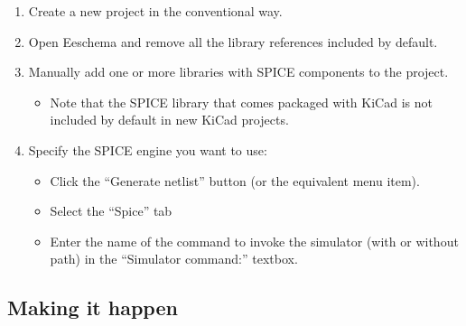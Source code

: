 \begin{enumerate}
\item Create a new project in the conventional way.
\item Open Eeschema and remove all the library references included by default.
\item Manually add one or more libraries with SPICE components to the project.
\begin{itemize}
  \item Note that the SPICE library that comes packaged with KiCad is not
  included by default in new KiCad projects.
\end{itemize}
\item Specify the SPICE engine you want to use:
\begin{itemize}
  \item Click the “Generate netlist” button (or the equivalent menu item).
  \item Select the “Spice” tab
  \item Enter the name of the command to invoke the simulator (with or without
path) in the “Simulator command:” textbox.
\end{itemize}
\end{enumerate}

\subsection{Making it happen}

